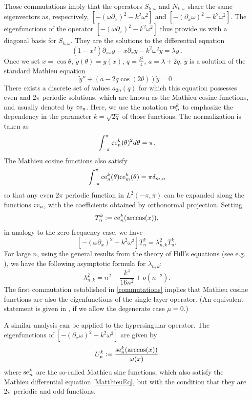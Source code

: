 \documentclass[a4paper]{article}
\begin{document}
Those commutations imply that the operators $S_{k,\omega}$ and $N_{k,\omega}$ share the same eigenvectors as, respectively, 
$\left[-(\omega \partial_x)^2 - k^2\omega^2\right]$ and $ \left[-(\partial_x \omega)^2 - k^2\omega^2\right]$. The eigenfunctions 
of the operator $\left[ -(\omega \partial_x)^2 - k^2\omega^2\right]$ thus provide us with a diagonal basis for $S_{k,\omega}$. 
They are the solutions to the differential equation 
\[ (1-x^2) \partial_{xx}y - x \partial_xy - k^2 \omega^2 y = \lambda y\,.\]
Once we set $x = \cos \theta$, $\tilde{y}(\theta) = y(x)$,  $q = \frac{k^2}{4}$, $a = \lambda + 2q$, $\tilde{y}$ is a solution of the 
standard Mathieu equation 
\begin{equation}
\label{MatthieuEq}
	\tilde{y}'' + (a - 2q \cos(2\theta)) \tilde{y} = 0\,.
\end{equation}
There exists a discrete set of values $a_{2n}(q)$ for which this equation possesses even and $2\pi$ periodic solutions, which are 
known as the Mathieu cosine functions, and usually denoted by $\textup{ce}_n$. Here, we use the notation $\textup{ce}^k_n$ to 
emphasize the dependency in the parameter $k = \sqrt{2q}$ of those functions. The normalization is taken as
\[ \int_{-\pi}^{\pi} \textup{ce}^k_n(\theta)^2 d\theta = \pi.\]
	The Mathieu cosine functions also satisfy
\[ \int_{-\pi}^{\pi}\textup{ce}^k_n(\theta) \textup{ce}^k_m(\theta) = \pi \delta_{m,n}\]
so that any even $2\pi$ periodic function in $L^2(-\pi,\pi)$ can be expanded along the functions $\textup{ce}_n$, with the coefficients 
obtained by orthonormal projection. Setting 
\[T_{n}^k \mathrel{\mathop:}= \textup{ce}^k_n(\arccos(x)),\]
in analogy to the zero-frequency case, we have
\[\left[-(\omega \partial_x)^2 - k^2\omega^2\right] T_{n}^k = \lambda_{n,k}^2 T_{n}^k.\]
For large $n$, using the general results from the theory of Hill's equations (see e.g. \cite[eq. (21), (28) and (29)]{NIST:DLMF}), 
we have the following 
asymptotic formula for $\lambda_{n,k}$:
\[ \lambda_{n,k}^2 = n^2 - \frac{k^4}{16n^2} +o \left(n^{-2}\right). \]
The first commutation established in \autoref{commutations} implies that Mathieu cosine functions are also the eigenfunctions of the 
single-layer operator. (An equivalent statement is given in \cite[Thm 4.2]{betcke2014spectral}, if we allow the degenerate case $\mu = 0$.) 

A similar analysis can be applied to the hypersingular operator. The eigenfunctions of $\left[-(\partial_x \omega)^2 - k^2 \omega^2\right]$ 
are given by 
\[U_n^k \mathrel{\mathop:}= \frac{\textup{se}_n^k(\arccos(x))}{\omega(x)}\]
where $\textup{se}_n^k$ are the so-called Mathieu sine functions, which also satisfy the Mathieu differential equation \eqref{MatthieuEq}, 
but with the condition that they are $2\pi$ periodic and odd functions. 
\end{document}

